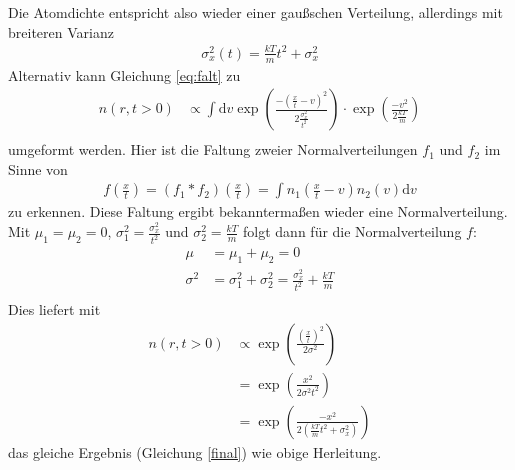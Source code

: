 \documentclass[10pt,a4paper]{extarticle}
\begin{document}
Die Atomdichte entspricht also wieder einer gaußschen Verteilung, allerdings mit breiteren Varianz
\begin{align}
\sigma_x^2 \left(t\right) = \frac{kT}{m}t^2 + \sigma_x^2 \label{final} 
\end{align}
Alternativ kann Gleichung \eqref{eq:falt} zu 
\begin{align}
n(r, t> 0) &\varpropto \int \mathrm{d}v \exp\left(\frac{-(\frac{x}{t}-v)^2}{2 \frac{\sigma_x^2}{t^2}}\right) \cdot \exp \left(\frac{-v^2}{2\frac{kT}{m}}\right) \\
\end{align}
umgeformt werden.
Hier ist die Faltung zweier Normalverteilungen $f_1$ und $f_2$ im Sinne von
\begin{align}
f \left(\frac{x}{t}\right) = \left(f_1 * f_2\right) \left(\frac{x}{t}\right) = \int  n_1\left(\frac{x}{t}-v\right) n_2 \left(v\right)\mathrm{d}v
\end{align}
zu erkennen.
Diese Faltung ergibt bekanntermaßen wieder eine Normalverteilung.
Mit $\mu_1 = \mu_2 = 0$, $\sigma_1^2 = \frac{\sigma_x^2}{t^2}$ und $\sigma_2^2 = \frac{kT}{m}$ folgt dann für die Normalverteilung $f$:
\begin{align}
\mu &= \mu_1 + \mu_2 = 0 \\
\sigma^2 &= \sigma_1^2 + \sigma_2^2 =  \frac{\sigma_x^2}{t^2} + \frac{kT}{m}\\
\end{align}
Dies liefert mit 
\begin{align}
n(r, t> 0) &\varpropto \exp\left(\frac{\left(\frac{x}{t}\right)^2}{2 \sigma^2}\right) \\
&= \exp\left(\frac{x^2}{2 \sigma^2 t^2}\right) \\
&= \exp\left(\frac{- x^2 }{2\left(\frac{kT}{m}t^2 + \sigma_x^2\right)}\right) 
\end{align}
das gleiche Ergebnis (Gleichung \eqref{final}) wie obige Herleitung.
\end{document}
